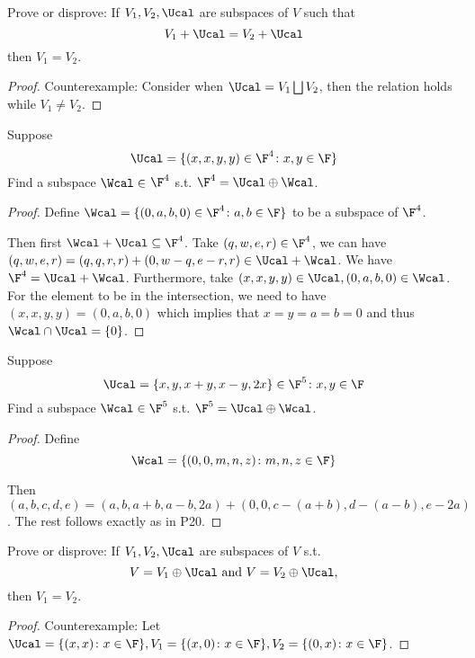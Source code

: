 \documentclass{extarticle}
\begin{document}
\begin{problem}{19}
    Prove or disprove: If \(V_1, V_2, \Ucal\) are subspaces of \(V\) such that 
    \[V_1 + \Ucal = V_2 + \Ucal\]
    then \(V_1 = V_2\).
\end{problem}

\begin{proof}
Counterexample: Consider when \(\Ucal = V_1 \bigsqcup V_2\), then the relation holds 
while \(V_1 \neq V_2\).
\end{proof}

\begin{problem}{20}
    Suppose 
    \[\Ucal = \{(x,x,y,y) \in \F^4 \colon x, y \in \F\}\]
    Find a subspace \(\Wcal \in\) \(\F^4\) s.t. \(\F^4  =\Ucal \oplus \Wcal\).
\end{problem}

\begin{proof}
Define \(\Wcal = \{(0, a, b, 0) \in \F^4 \colon a,b \in \F\}\) to be a subspace 
of \(\F^4\).

Then first \(\Wcal + \Ucal \subseteq \F^4\). Take \((q,w,e,r) \in \F^4\), we 
can have \((q,w,e,r) = (q,q,r,r) + (0,w-q,e-r,r) \in \Ucal + \Wcal\). We have 
\(\F^4 = \Ucal + \Wcal\). Furthermore, take \((x,x,y,y) \in \Ucal, (0,a,b,0) \in 
\Wcal\). For the element to be in the intersection, we need to have 
\((x,x,y,y)=(0,a,b,0)\) which implies that \(x=y=a=b=0\) and thus \(\Wcal 
\cap \Ucal = \{0\}\). 
\end{proof}

\begin{problem}{21}
    Suppose 
    \[\Ucal = \{x, y, x+y, x-y, 2x\} \in \F^5 \colon x,y \in \F\]
    Find a subspace \(\Wcal \in \F^5\) s.t. \(\F^5 = \Ucal \oplus \Wcal\). 
\end{problem}

\begin{proof}
Define 
\[\Wcal = \{(0,0,m,n,z) \colon m,n,z \in \F\}\]

Then \((a,b,c,d,e) = (a, b, a+b, a-b, 2a) + (0,0, c-(a+b), d-(a - b), e-2a)\). The 
rest follows exactly as in P20.
\end{proof}

\begin{problem}{23}
    Prove or disprove: If \(V_1, V_2, \Ucal\) are subspaces of \(V\) s.t. 
    \[V = V_1 \oplus \Ucal \text{ and } V = V_2 \oplus \Ucal ,\] 
    then \(V_1 = V_2\).
\end{problem}

\begin{proof}
Counterexample: Let \(\Ucal = \{(x,x) \colon x \in \F\}, V_1 = \{(x,0)\colon x \in \F\},
V_2 = \{(0, x) \colon x \in \F\}\). 
\end{proof}
\end{document}
